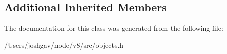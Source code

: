 \subsection*{Additional Inherited Members}


The documentation for this class was generated from the following file\+:\begin{DoxyCompactItemize}
\item 
/\+Users/joshgav/node/v8/src/objects.\+h\end{DoxyCompactItemize}
